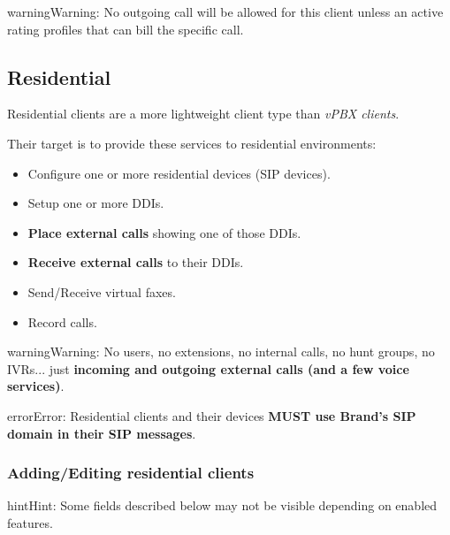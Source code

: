 \documentclass[letterpaper,10pt,english]{sphinxmanual}
\begin{document}
\begin{notice}{warning}{Warning:}
No outgoing call will be allowed for this client unless an active rating profiles that can
bill the specific call.
\end{notice}


\subsection{Residential}
\label{administration_portal/brand/clients/residential:residential}\label{administration_portal/brand/clients/residential::doc}
Residential clients are a more lightweight client type than \emph{vPBX clients}.

Their target is to provide these services to residential environments:
\begin{itemize}
\item {} 
Configure one or more residential devices (SIP devices).

\item {} 
Setup one or more DDIs.

\item {} 
\textbf{Place external calls} showing one of those DDIs.

\item {} 
\textbf{Receive external calls} to their DDIs.

\item {} 
Send/Receive virtual faxes.

\item {} 
Record calls.

\end{itemize}

\begin{notice}{warning}{Warning:}
No users, no extensions, no internal calls, no hunt groups, no IVRs... just \textbf{incoming and outgoing external
calls (and a few voice services)}.
\end{notice}

\begin{notice}{error}{Error:}
Residential clients and their devices \textbf{MUST use Brand's SIP domain in their SIP messages}.
\end{notice}


\subsubsection{Adding/Editing residential clients}
\label{administration_portal/brand/clients/residential:adding-editing-residential-clients}
\begin{notice}{hint}{Hint:}
Some fields described below may not be visible depending on enabled features.
\end{notice}
\end{document}
